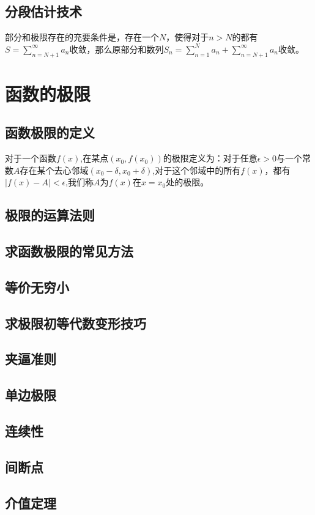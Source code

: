 \documentclass[12pt,a4paper,UTF8]{ctexbook}
\theoremstyle{plain}
\begin{document}
\section{分段估计技术}
部分和极限存在的充要条件是，存在一个$N$，使得对于$n>N$的都有$S=\sum_{n=N+1}^\infty a_n$收敛，那么原部分和数列$S_n=\sum_{n=1}^N a_n+\sum_{n=N+1}^\infty a_n$收敛。
\chapter{函数的极限}
\section{函数极限的定义}
对于一个函数$f(x)$,在某点$(x_0,f(x_0))$的极限定义为：对于任意$\epsilon>0$与一个常数$A$存在某个去心邻域$(x_0-\delta,x_0+\delta)$,对于这个邻域中的所有$f(x)$，都有$|f(x)-A|<\epsilon$,我们称$A$为$f(x)在x=x_0$处的极限。
\section{极限的运算法则}

\section{求函数极限的常见方法}
\section{等价无穷小}
\section{求极限初等代数变形技巧}
\section{夹逼准则}
\section{单边极限}
\section{连续性}
\section{间断点}
\section{介值定理}
\end{document}
